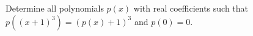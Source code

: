 Determine all polynomials $p(x)$ with real coefficients such that $p((x+1)^3)=(p(x)+1)^3$ and $p(0)=0$.